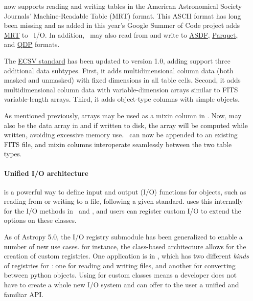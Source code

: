 \documentclass[modern]{aastex631}
\begin{document}
\astropy now supports reading and writing tables in the American Astronomical
Society Journals' Machine-Readable Table (MRT) format. This ASCII format has
long been missing and as added in this year's Google Summer of Code project adds
\href{https://docs.astropy.org/en/stable/io/ascii/write.html#cds-mrt-format}{MRT}
to \astropyTable\ I/O. In addition, \astropyTable\ may also read from and write
to \href{https://asdf-standard.readthedocs.io/en/latest/}{ASDF},
\href{https://docs.astropy.org/en/stable/io/unified.html#table-io-parquet}{Parquet},
and \href{https://wwwastro.msfc.nasa.gov/qdp/}{QDP} formats.

The \href{https://github.com/astropy/astropy-APEs/blob/main/APE6.rst}{ECSV
standard} has been updated to version 1.0, adding support three additional data
subtypes. First, it adds multidimensional column data (both masked and unmasked)
with fixed dimensions in all table cells. Second, it adds multidimensional
column data with variable-dimension arrays similar to FITS variable-length
arrays. Third, it adds object-type columns with simple \python objects.

As mentioned previously,  arrays may be used as a mixin column in
\astropyTable. Now,  may also be the data array in
 and if written to disk, the array
will be computed while written, avoiding excessive memory use. \astropyTable\ can
now be appended to an existing FITS file, and  mixin columns
interoperate seamlessly between the two table types.

\paragraph{Unified I/O architecture}

 is a powerful way to define input and output (I/O)
functions for \astropypkg objects, such as reading from or writing to a file,
following a given standard. \astropy uses this internally for the I/O methods in
\astropyTable\ and \astropyCosmology, and users can register custom I/O to
extend the options on these classes.

As of Astropy 5.0, the I/O registry submodule has been generalized to enable a
number of new use cases. for instance, the class-based architecture allows for
the creation of custom registries. One application is in \astropycosmology,
which has two different \textit{kinds} of registries for \astropyCosmology: one
for reading and writing files, and another for converting between python
objects. Using  for custom classes means a developer
does not have to create a whole new I/O system and can offer to the user a
unified and familiar API.
\end{document}
